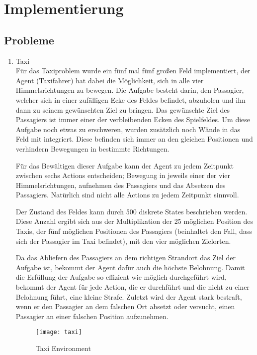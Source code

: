 \section{Implementierung}


\subsection{Probleme} \label{Probleme}

\begin{enumerate}
    \item Taxi\\
    Für das Taxiproblem wurde ein fünf mal fünf großen Feld implementiert, der Agent (Taxifahrer) hat dabei die Möglichkeit, sich in alle vier Himmelsrichtungen zu bewegen. Die Aufgabe besteht darin, den Passagier, welcher sich in einer zufälligen Ecke des Feldes befindet, abzuholen und ihn dann zu seinem gewünschten Ziel zu bringen. Das gewünschte Ziel des Passagiers ist immer einer der verbleibenden Ecken des Spielfeldes. Um diese Aufgabe noch etwas zu erschweren, wurden zusätzlich noch Wände in das Feld mit integriert. Diese befinden sich immer an den gleichen Positionen und verhindern Bewegungen in bestimmte Richtungen.

    Für das Bewältigen dieser Aufgabe kann der Agent zu jedem Zeitpunkt zwischen sechs Actions entscheiden; Bewegung in jeweils einer der vier Himmelsrichtungen, aufnehmen des Passagiers und das Absetzen des Passagiers. Natürlich sind nicht alle Actions zu jedem Zeitpunkt sinnvoll. 

    Der Zustand des Feldes kann durch 500 diskrete States beschrieben werden. Diese Anzahl ergibt sich aus der Multiplikation der 25 möglichen Position des Taxis, der fünf möglichen Positionen des Passagiers (beinhaltet den Fall, dass sich der Passagier im Taxi befindet), mit den vier möglichen Zielorten.

    Da das Abliefern des Passagiers an dem richtigen Strandort das Ziel der Aufgabe ist, bekommt der Agent dafür auch die höchste Belohnung. Damit die Erfüllung der Aufgabe so effizient wie möglich durchgeführt wird, bekommt der Agent für jede Action, die er durchführt und die nicht zu einer Belohnung führt, eine kleine Strafe. Zuletzt wird der Agent stark bestraft, wenn er den Passagier an dem falschen Ort absetzt oder versucht, einen Passagier an einer falschen Position aufzunehmen.
    \begin{figure}
        \centering
        \texttt{[image: taxi]}
        \caption{Taxi Environment}
        \label{fig:taxi_env}
    \end{figure}
    

\end{enumerate}
